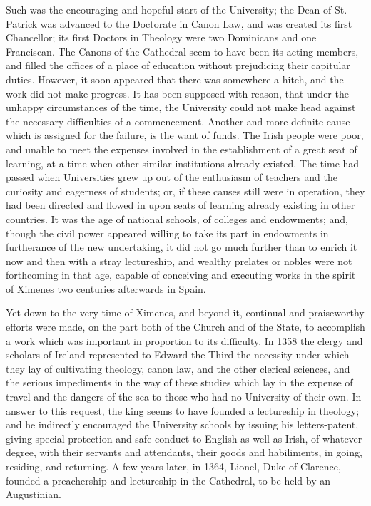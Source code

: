 Such was the encouraging and
hopeful start of the University; the Dean of St. Patrick was advanced
to the Doctorate in Canon Law, and was created its first Chancellor;
its first Doctors in Theology were two Dominicans and one Franciscan.
The Canons of the Cathedral seem to have been its acting members, and
filled the offices of a place of education without prejudicing
their capitular duties. However, it soon appeared that there was
somewhere a hitch, and the work did not make progress. It has been
supposed with reason, that under the unhappy circumstances of the
time, the University could not make head against the necessary
difficulties of a commencement. Another and more definite cause which
is assigned for the failure, is the want of funds. The Irish people
were poor, and unable to meet the expenses involved in the
establishment of a great seat of learning, at a time when other
similar institutions already existed. The time had passed when
Universities grew up out of the enthusiasm of teachers and the
curiosity and eagerness of students; or, if these causes still were in
operation, they had been directed and flowed in upon seats of learning
already existing in other countries. It was the age of national
schools, of colleges and endowments; and, though the civil power
appeared willing to take its part in endowments in furtherance of the
new undertaking, it did not go much further than to enrich it now and
then with a stray lectureship, and wealthy prelates or nobles were not
forthcoming in that age, capable of conceiving and executing works in
the spirit of Ximenes two centuries afterwards in Spain.

Yet down to the very time of
Ximenes, and beyond it, continual and praiseworthy efforts were made,
on the part both of the Church and of the State, to accomplish a work
which was important in proportion to its difficulty. In 1358 the
clergy and scholars of Ireland represented to Edward the Third the
necessity under which they lay of cultivating theology, canon law, and
the other clerical sciences, and the serious impediments in the way of
these studies which lay in the expense of travel and the dangers
of the sea to those who had no University of their own. In answer to
this request, the king seems to have founded a lectureship in
theology; and he indirectly encouraged the University schools by
issuing his letters-patent, giving special protection and safe-conduct
to English as well as Irish, of whatever degree, with their servants
and attendants, their goods and habiliments, in going, residing, and
returning. A few years later, in 1364, Lionel, Duke of Clarence,
founded a preachership and lectureship in the Cathedral, to be held by
an Augustinian.


